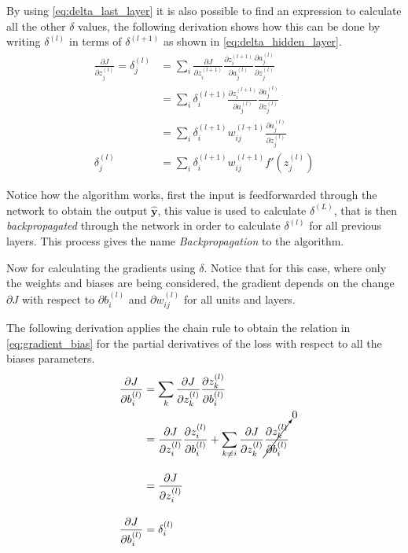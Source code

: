 By using \autoref{eq:delta_last_layer} it is also possible to find an expression to calculate all the other $\delta$ values, the following derivation shows how this can be done by writing $\delta^{(l)}$ in terms of $\delta^{(l+1)}$ as shown in \autoref{eq:delta_hidden_layer}.
\begin{align}
    \frac{\partial J}{\partial z_j^{(l)}} = \delta_j^{(l)} &= \sum_{i}{
        \frac{\partial J}{\partial z_i^{(l+1)}}
        \frac{\partial z_i^{(l+1)}}{\partial a_j^{(l)}}
        \frac{\partial a_j^{(l)}}{\partial z_j^{(l)}}
    } \nonumber \\[10pt]
    &= \sum_{i}{
        \delta_i^{(l+1)}
        \frac{\partial z_i^{(l+1)}}{\partial a_j^{(l)}}
        \frac{\partial a_j^{(l)}}{\partial z_j^{(l)}}
    } \nonumber \\[10pt]
    &= \sum_{i}{
        \delta_i^{(l+1)}
        w_{ij}^{(l+1)}
        \frac{\partial a_j^{(l)}}{\partial z_j^{(l)}}
    } \nonumber \\[10pt]
    \delta_j^{(l)} &= \sum_{i}{
        \delta_i^{(l+1)}
        w_{ij}^{(l+1)}
        f'\left( z_j^{(l)} \right)
    } \label{eq:delta_hidden_layer}
\end{align}

Notice how the algorithm works, first the input is feedforwarded through the network to obtain the output $\hat{\bm{y}}$, this value is used to calculate $\delta^{(L)}$, that is then \textit{backpropagated} through the network in order to calculate $\delta^{(l)}$ for all previous layers. This process gives the name \textit{Backpropagation} to the algorithm.

Now for calculating the gradients using $\delta$. Notice that for this case, where only the weights and biases are being considered, the gradient depends on the change $\partial J$ with respect to $\partial b_i^{(l)}$ and $\partial w_{ij}^{(l)}$ for all units and layers.

The following derivation applies the chain rule to obtain the relation in \autoref{eq:gradient_bias} for the partial derivatives of the loss with respect to all the biases parameters.
\begin{align}
    \frac{\partial J}{\partial b_i^{(l)}} &= \sum_{k}{
        \frac{\partial J}{\partial z_k^{(l)}}
        \frac{\partial z_k^{(l)}}{\partial b_i^{(l)}}
    } \nonumber \\
    &= \frac{\partial J}{\partial z_i^{(l)}} \frac{\partial z_i^{(l)}}{\partial b_i^{(l)}} + 
    \sum_{k \neq i}{
        \frac{\partial J}{\partial z_k^{(l)}}
        \cancelto{0}{\frac{\partial z_k^{(l)}}{\partial b_i^{(l)}}}
    } \nonumber \\[10pt]
    &= \frac{\partial J}{\partial z_i^{(l)}} \nonumber \\[10pt]
    \frac{\partial J}{\partial b_i^{(l)}} &= \delta_{i}^{(l)} \label{eq:gradient_bias}
\end{align}


